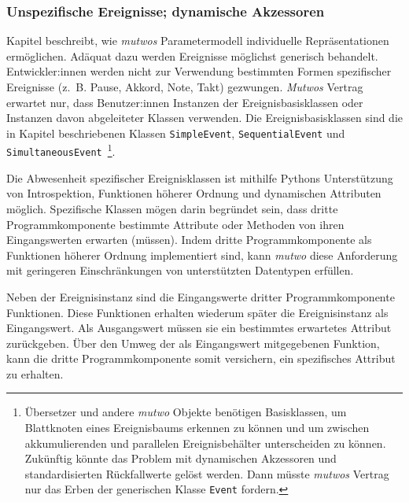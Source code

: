 \documentclass[12pt,a4paper,ngerman]{article}
\begin{document}
\subsubsection{Unspezifische Ereignisse; dynamische Akzessoren}

Kapitel \emph{} beschreibt, wie \emph{mutwos} Parametermodell individuelle Repräsentationen ermöglichen.
Adäquat dazu werden Ereignisse möglichst generisch behandelt.
Entwickler:innen werden nicht zur Verwendung bestimmten Formen spezifischer Ereignisse (z.~B. Pause, Akkord, Note, Takt) gezwungen.
\emph{Mutwos} Vertrag erwartet nur, dass Benutzer:innen Instanzen der Ereignisbasisklassen oder Instanzen davon abgeleiteter Klassen verwenden.
Die Ereignisbasisklassen sind die in Kapitel \emph{} beschriebenen Klassen \texttt{SimpleEvent}, \texttt{SequentialEvent} und \texttt{SimultaneousEvent}~\footnote{%
    Übersetzer und andere \emph{mutwo} Objekte benötigen Basisklassen, um Blattknoten eines Ereignisbaums erkennen zu können und um zwischen akkumulierenden und parallelen Ereignisbehälter unterscheiden zu können.
    Zukünftig könnte das Problem mit dynamischen Akzessoren und standardisierten Rückfallwerte gelöst werden.
    Dann müsste \emph{mutwos} Vertrag nur das Erben der generischen Klasse \texttt{Event} fordern.
}.

\bigskip

Die Abwesenheit spezifischer Ereignisklassen ist mithilfe Pythons Unterstützung von Introspektion, Funktionen höherer Ordnung und dynamischen Attributen möglich.
Spezifische Klassen mögen darin begründet sein, dass dritte Programmkomponente bestimmte Attribute oder Methoden von ihren Eingangswerten erwarten (müssen).
Indem dritte Programmkomponente als Funktionen höherer Ordnung implementiert sind, kann \emph{mutwo} diese Anforderung mit geringeren Einschränkungen von unterstützten Datentypen erfüllen.

\bigskip

Neben der Ereignisinstanz sind die Eingangswerte dritter Programmkomponente Funktionen.
Diese Funktionen erhalten wiederum später die Ereignisinstanz als Eingangswert.
Als Ausgangswert müssen sie ein bestimmtes erwartetes Attribut zurückgeben.
Über den Umweg der als Eingangswert mitgegebenen Funktion, kann die dritte Programmkomponente somit versichern, ein spezifisches Attribut zu erhalten.

%
\end{document}
